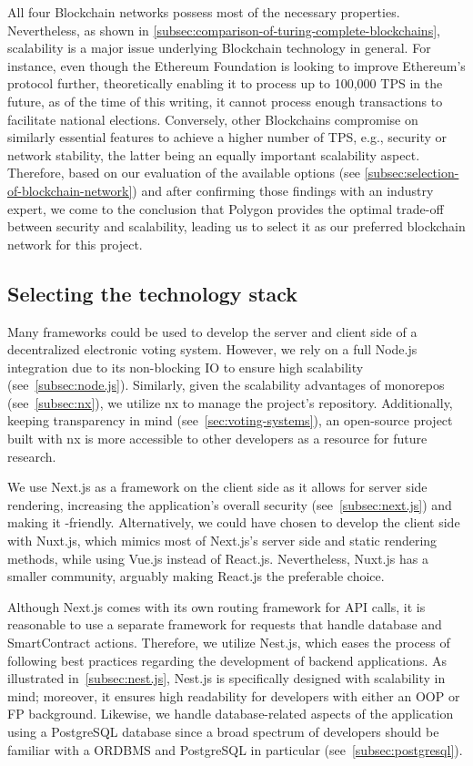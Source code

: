 All four \gls{Blockchain} networks possess most of the necessary properties.
Nevertheless, as shown in \cref{subsec:comparison-of-turing-complete-blockchains}, scalability is a major issue underlying \gls{Blockchain} technology in general.
For instance, even though the Ethereum Foundation is looking to improve Ethereum's protocol further, theoretically enabling it to process up to 100,000 \gls{TPS} in the future, as of the time of this writing, it cannot process enough transactions to facilitate national elections.
Conversely, other \glspl{Blockchain} compromise on similarly essential features to achieve a higher number of \gls{TPS}, e.g., security or network stability, the latter being an equally important scalability aspect.
Therefore, based on our evaluation of the available options (see \cref{subsec:selection-of-blockchain-network}) and after confirming those findings with an industry expert, we come to the conclusion that Polygon provides the optimal trade-off between security and scalability, leading us to select it as our preferred blockchain network for this project.

\subsection{Selecting the technology stack}\label{subsec:selection-of-tech-stack}

Many frameworks could be used to develop the server and client side of a decentralized electronic voting system.
However, we rely on a full Node.js integration due to its non-blocking \gls{IO} to ensure high scalability (see~\cref{subsec:node.js}).
Similarly, given the scalability advantages of monorepos (see~\cref{subsec:nx}), we utilize nx to manage the project's repository.
Additionally, keeping transparency in mind (see~\cref{sec:voting-systems}), an open-source project built with nx is more accessible to other developers as a resource for future research.

We use Next.js as a framework on the client side as it allows for server side rendering, increasing the application's overall security (see~\cref{subsec:next.js}) and making it -friendly.
Alternatively, we could have chosen to develop the client side with Nuxt.js, which mimics most of Next.js's server side and static rendering methods, while using Vue.js instead of React.js.
Nevertheless, Nuxt.js has a smaller community, arguably making React.js the preferable choice.

Although Next.js comes with its own routing framework for API calls, it is reasonable to use a separate framework for requests that handle database and \gls{SmartContract} actions.
Therefore, we utilize Nest.js, which eases the process of following best practices regarding the development of backend applications.
As illustrated in~\cref{subsec:nest.js}, Nest.js is specifically designed with scalability in mind;
moreover, it ensures high readability for developers with either an \gls{OOP} or \gls{FP} background.
Likewise, we handle  database-related aspects of the application using a PostgreSQL database since a broad spectrum of developers should be familiar with a \gls{ORDBMS} and PostgreSQL in particular (see~\cref{subsec:postgresql}).

